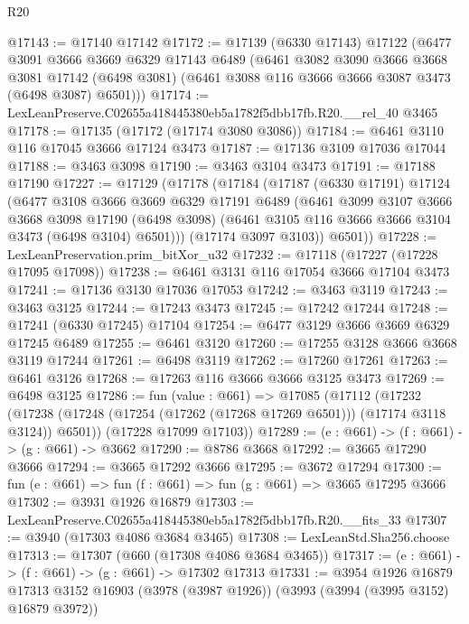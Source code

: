 \begin{lexlean}{R20}
\begin{coremodule}
@17143 := @17140 @17142
@17172 := @17139
    (@6330 @17143)
    @17122
    (@6477
      @3091
      @3666
      @3669
      @6329
      @17143
      @6489
      (@6461
        @3082
        @3090
        @3666
        @3668
        @3081
        @17142
        (@6498 @3081)
        (@6461 @3088 @116 @3666 @3666 @3087 @3473 (@6498 @3087) @6501)))
@17174 := LexLeanPreserve.C02655a418445380eb5a1782f5dbb17fb.R20.__rel_40 @3465
@17178 := @17135 (@17172 (@17174 @3080 @3086))
@17184 := @6461 @3110 @116 @17045 @3666 @17124 @3473
@17187 := @17136 @3109 @17036 @17044
@17188 := @3463 @3098
@17190 := @3463 @3104 @3473
@17191 := @17188 @17190
@17227 := @17129
    (@17178
      (@17184
        (@17187
          (@6330 @17191)
          @17124
          (@6477
            @3108
            @3666
            @3669
            @6329
            @17191
            @6489
            (@6461
              @3099
              @3107
              @3666
              @3668
              @3098
              @17190
              (@6498 @3098)
              (@6461 @3105 @116 @3666 @3666 @3104 @3473 (@6498 @3104) @6501)))
          (@17174 @3097 @3103))
        @6501))
@17228 := LexLeanPreservation.prim_bitXor_u32
@17232 := @17118 (@17227 (@17228 @17095 @17098))
@17238 := @6461 @3131 @116 @17054 @3666 @17104 @3473
@17241 := @17136 @3130 @17036 @17053
@17242 := @3463 @3119
@17243 := @3463 @3125
@17244 := @17243 @3473
@17245 := @17242 @17244
@17248 := @17241 (@6330 @17245) @17104
@17254 := @6477 @3129 @3666 @3669 @6329 @17245 @6489
@17255 := @6461 @3120
@17260 := @17255 @3128 @3666 @3668 @3119 @17244
@17261 := @6498 @3119
@17262 := @17260 @17261
@17263 := @6461 @3126
@17268 := @17263 @116 @3666 @3666 @3125 @3473
@17269 := @6498 @3125
@17286 := fun (value : @661) =>
  @17085
    (@17112
      (@17232 (@17238 (@17248 (@17254 (@17262 (@17268 @17269 @6501))) (@17174 @3118 @3124)) @6501))
      (@17228 @17099 @17103))
@17289 := (e : @661) -> (f : @661) -> (g : @661) -> @3662
@17290 := @8786 @3668
@17292 := @3665 @17290 @3666
@17294 := @3665 @17292 @3666
@17295 := @3672 @17294
@17300 := fun (e : @661) => fun (f : @661) => fun (g : @661) => @3665 @17295 @3666
@17302 := @3931 @1926 @16879
@17303 := LexLeanPreserve.C02655a418445380eb5a1782f5dbb17fb.R20.__fits_33
@17307 := @3940 (@17303 @4086 @3684 @3465)
@17308 := LexLeanStd.Sha256.choose
@17313 := @17307 (@660 (@17308 @4086 @3684 @3465))
@17317 := (e : @661) -> (f : @661) -> (g : @661) -> @17302 @17313
@17331 := @3954
    @1926
    @16879
    @17313
    @3152
    @16903
    (@3978 (@3987 @1926))
    (@3993 (@3994 (@3995 @3152) @16879 @3972))

\end{coremodule}
\end{lexlean}
